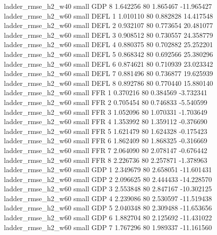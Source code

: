       ladder_rmse_h2_w40      small      GDP                 8 1.642256 80       1.865467         -11.965427
      ladder_rmse_h2_w60      small     DEFL                 1 1.010110 80       0.882828          14.417548
      ladder_rmse_h2_w60      small     DEFL                 2 0.932107 80       0.773654          20.481077
      ladder_rmse_h2_w60      small     DEFL                 3 0.908512 80       0.730557          24.358779
      ladder_rmse_h2_w60      small     DEFL                 4 0.880375 80       0.702882          25.252201
      ladder_rmse_h2_w60      small     DEFL                 5 0.868342 80       0.692566          25.380296
      ladder_rmse_h2_w60      small     DEFL                 6 0.874621 80       0.710939          23.023342
      ladder_rmse_h2_w60      small     DEFL                 7 0.881496 80       0.736877          19.625939
      ladder_rmse_h2_w60      small     DEFL                 8 0.892786 80       0.770440          15.880140
      ladder_rmse_h2_w60      small      FFR                 1 0.370216 80       0.384569          -3.732341
      ladder_rmse_h2_w60      small      FFR                 2 0.705454 80       0.746833          -5.540599
      ladder_rmse_h2_w60      small      FFR                 3 1.052096 80       1.070331          -1.703649
      ladder_rmse_h2_w60      small      FFR                 4 1.353992 80       1.359112          -0.376690
      ladder_rmse_h2_w60      small      FFR                 5 1.621479 80       1.624328          -0.175423
      ladder_rmse_h2_w60      small      FFR                 6 1.862409 80       1.868325          -0.316669
      ladder_rmse_h2_w60      small      FFR                 7 2.064090 80       2.078147          -0.676442
      ladder_rmse_h2_w60      small      FFR                 8 2.226736 80       2.257871          -1.378963
      ladder_rmse_h2_w60      small      GDP                 1 2.349679 80       2.658051         -11.601431
      ladder_rmse_h2_w60      small      GDP                 2 2.096625 80       2.444433         -14.228570
      ladder_rmse_h2_w60      small      GDP                 3 2.553848 80       2.847167         -10.302125
      ladder_rmse_h2_w60      small      GDP                 4 2.239086 80       2.530597         -11.519438
      ladder_rmse_h2_w60      small      GDP                 5 2.040348 80       2.309488         -11.653656
      ladder_rmse_h2_w60      small      GDP                 6 1.882704 80       2.125692         -11.431022
      ladder_rmse_h2_w60      small      GDP                 7 1.767296 80       1.989337         -11.161560
